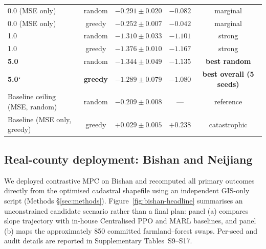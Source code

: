 \documentclass[11pt]{article}
\begin{document}
\begin{table}[htbp]
{\begin{tabular}{lccccc}
\midrule
0.0 (MSE only)                  & random & \multicolumn{2}{c}{$-0.291 \pm 0.020$} & $-0.082$ & marginal \\
0.0 (MSE only)                  & greedy & \multicolumn{2}{c}{$-0.252 \pm 0.007$} & $-0.042$ & marginal \\
1.0                             & random & \multicolumn{2}{c}{$-1.310 \pm 0.033$} & $-1.101$ & strong \\
1.0                             & greedy & \multicolumn{2}{c}{$-1.376 \pm 0.010$} & $-1.167$ & strong \\
\textbf{5.0}                    & random & \multicolumn{2}{c}{$\mathbf{-1.344 \pm 0.049}$} & $-1.135$ & \textbf{best random} \\
\textbf{5.0}$^{\star}$          & \textbf{greedy} & \multicolumn{2}{c}{$\mathbf{-1.289 \pm 0.079}$} & $\mathbf{-1.080}$ & \textbf{best overall (5 seeds)} \\
Baseline ceiling (MSE, random)  & random & \multicolumn{2}{c}{$-0.209 \pm 0.008$} & --- & reference \\
Baseline (MSE only, greedy)     & greedy & \multicolumn{2}{c}{$+0.029 \pm 0.005$} & $+0.238$ & catastrophic \\
\bottomrule
\end{tabular}
}
\end{table}

\subsection{Real-county deployment: Bishan and Neijiang}\label{sec:counties}

We deployed contrastive MPC on Bishan and recomputed all primary outcomes directly from the optimised cadastral shapefile using an independent GIS-only script (Methods \S\ref{sec:methods}). Figure~\ref{fig:bishan-headline} summarises an unconstrained candidate scenario rather than a final plan: panel (a) compares slope trajectory with in-house Centralised PPO and MARL baselines, and panel (b) maps the approximately 850 committed farmland--forest swaps. Per-seed and audit details are reported in Supplementary Tables~S9--S17.
\end{document}
